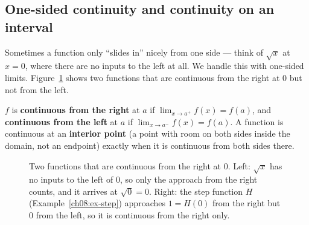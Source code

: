 \subsection{One-sided continuity and continuity on an interval}

Sometimes a function only ``slides in'' nicely from one side --- think of $\sqrt{x}$ at
$x=0$, where there are no inputs to the left at all. We handle this with one-sided
limits. Figure~\ref{ch08:fig-onesided} shows two functions that are continuous from the
right at $0$ but not from the left.

\begin{definition}
\label{ch08:def-onesided}
$f$ is \textbf{continuous from the right} at $a$ if $\lim_{x\to a^+} f(x)=f(a)$, and
\textbf{continuous from the left} at $a$ if $\lim_{x\to a^-} f(x)=f(a)$. A function is
continuous at an \textbf{interior point} (a point with room on both sides inside the domain,
not an endpoint) exactly when it is continuous from both sides there.
\end{definition}

\begin{figure}[htbp]
\centering
{}
\caption{Two functions that are continuous from the right at $0$. Left: $\sqrt{x}$ has no
inputs to the left of $0$, so only the approach from the right counts, and it arrives at
$\sqrt{0}=0$. Right: the step function $H$ (Example~\ref{ch08:ex-step}) approaches $1=H(0)$
from the right but $0$ from the left, so it is continuous from the right only.}
\label{ch08:fig-onesided}
\end{figure}

